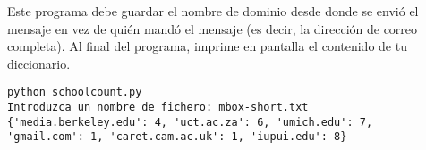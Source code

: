 \begin{ex}
Este programa debe guardar el nombre de dominio
desde donde se envió el mensaje en vez de quién mandó el mensaje
(es decir, la dirección de correo completa). Al final
del programa, imprime en pantalla el contenido de tu diccionario.

\beforeverb
\begin{verbatim}
python schoolcount.py
Introduzca un nombre de fichero: mbox-short.txt
{'media.berkeley.edu': 4, 'uct.ac.za': 6, 'umich.edu': 7, 
'gmail.com': 1, 'caret.cam.ac.uk': 1, 'iupui.edu': 8}
\end{verbatim}
\afterverb
\end{ex}